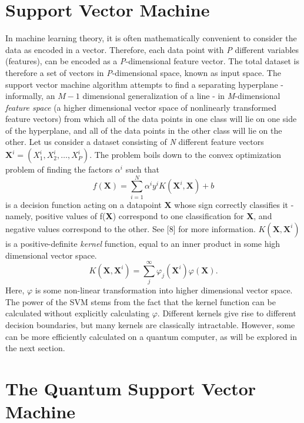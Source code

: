 \documentclass[twocolumn, english]{revtex4-2}
\numberwithin{equation}{section}
\begin{document}
\section{Support Vector Machine}

In machine learning theory, it is often mathematically convenient to consider the data as encoded in a vector. Therefore, each data point with \textit{P} different variables (features), can be encoded as a \textit{P}-dimensional feature vector. The total dataset is therefore a set of vectors in \textit{P}-dimensional space, known as input space. The support vector machine algorithm attempts to find a separating hyperplane - informally, an $\textit{M}-1$ dimensional generalization of a line - in \textit{M}-dimensional \textit{feature space} (a higher dimensional vector space of nonlinearly transformed feature vectors) from which all of the data points in one class will lie on one side of the hyperplane, and all of the data points in the other class will lie on the other. Let us consider a dataset consisting of \textit{N} different feature vectors $\textbf{X}^{i} = (\textit{X}^{i}_{1}, \textit{X}^{i}_{2}, …, \textit{X}^{i}_{P})$. The problem boils down to the convex optimization problem of finding the factors $\alpha^{i}$ such that \begin{equation}f(\textbf{X})=\sum_{i=1}^{N}\alpha^{i}y^{i}K(\textbf{X}^{i}, \textbf{X})+b\end{equation} is a decision function acting on a datapoint $\textbf{X}$ whose sign correctly classifies it - namely, positive values of f(\textbf{X}) correspond to one classification for \textbf{X}, and negative values correspond to the other. See [8] for more information. $\textit{K}(\textbf{X}, \textbf{X}^{i})$ is a positive-definite \textit{kernel} function, equal to an inner product in some high dimensional vector space. \begin{equation}\textit{K}(\textbf{X}, \textbf{X}^{i})=\sum_{j}^{\infty}\varphi_{j}(\textbf{X}^{i})\varphi(\textbf{X}).\end{equation} Here, $\varphi$ is some non-linear transformation into higher dimensional vector space. The power of the SVM stems from the fact that the kernel function can be calculated without explicitly calculating $\varphi$. Different kernels give rise to different decision boundaries, but many kernels are classically intractable. However, some can be more efficiently calculated on a quantum computer, as will be explored in the next section.

\section{The Quantum Support Vector Machine}
\end{document}
